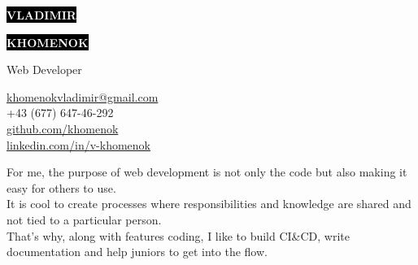 \documentclass[2pt]{template}
\makeatletter
\newcommand{\cvVarPhone}{+43 (677) 647-46-292}
\newcommand{\cvVarEmail}{khomenokvladimir@gmail.com}
\newcommand{\cvVarGitHub}{khomenok}
\newcommand{\cvVarLinkedIn}{v-khomenok}
\makeatother
\begin{document}
\begin{minipage}[t]{0.55\textwidth}
	\vspace{-\baselineskip}

	\colorbox{black}{{\HUGE\textcolor{white}{\textbf{\MakeUppercase{Vladimir}}}}}

	\colorbox{black}{{\HUGE\textcolor{white}{\textbf{\MakeUppercase{Khomenok}}}}}

	\vspace{3pt}

	{\huge Web Developer}
\end{minipage}
\begin{minipage}[t]{0.325\textwidth}

	\vspace{-\baselineskip}
	\href{mailto:\cvVarEmail}{\cvVarEmail}\\
	\cvVarPhone\\

	\href{https://github.com/khomenok}{{\color{gray}github.com/}\cvVarGitHub}\\
	\href{https://linkedin.com/in/v-khomenok}{{\color{gray}linkedin.com/in/}\cvVarLinkedIn}
\end{minipage}

\vspace{0.2cm}

For me, the purpose of web development is not only the code but also making it easy for others to use.\\
It is cool to create processes where responsibilities and knowledge are shared and not tied to a particular person.\\
That's why, along with features coding, I like to build CI\&CD, write documentation and help juniors to get into the flow. \\


\end{document}
